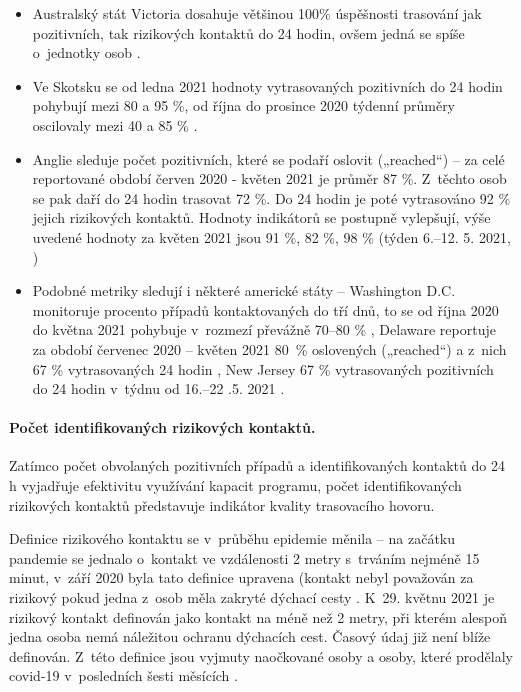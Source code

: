 \begin{itemize}
\item Australský stát Victoria dosahuje většinou 100\% úspěšnosti trasování jak pozitivních, tak rizikových kontaktů do 24 hodin, ovšem jedná se spíše o~jednotky osob \cite{tr_victoria}.
\item Ve Skotsku se od ledna 2021 hodnoty vytrasovaných pozitivních do 24 hodin pohybují mezi 80 a 95 \%, od října do prosince 2020 týdenní průměry oscilovaly mezi 40 a 85 \% \cite{tr_scotland}.
\item Anglie sleduje počet pozitivních, které se podaří oslovit („reached“) -- za celé reportované období červen 2020 - květen 2021 je průměr 87 \%. Z~těchto osob se pak daří do 24 hodin trasovat 72 \%. Do 24 hodin je poté vytrasováno 92 \% jejich rizikových kontaktů. Hodnoty indikátorů se postupně vylepšují, výše uvedené hodnoty za květen 2021 jsou 91 \%, 82 \%, 98 \% (týden 6.--12. 5. 2021, \cite{tr_gov_uk})
\item Podobné metriky sledují i některé americké státy -- Washington D.C. monitoruje procento případů kontaktovaných do tří dnů, to se od října 2020 do května 2021 pohybuje v~rozmezí převážně 70--80 \% \cite{tr_DC}, Delaware reportuje za období červenec 2020 -- květen 2021 80~\% oslovených („reached“) a z~nich 67 \% vytrasovaných 24 hodin \cite{tr_Delaware}, New Jersey 67 \% vytrasovaných pozitivních do 24 hodin v~týdnu od 16.--22 .5. 2021 \cite{tr_NewJersey}.
\end{itemize}


\paragraph{Počet identifikovaných rizikových kontaktů.} Zatímco počet obvolaných pozitivních případů a identifikovaných kontaktů do 24 h vyjadřuje efektivitu využívání kapacit programu, počet identifikovaných rizikových kontaktů představuje indikátor kvality trasovacího hovoru.

Definice rizikového kontaktu se v~průběhu epidemie měnila -- na začátku pandemie se jednalo o~kontakt ve vzdálenosti 2 metry s~trváním nejméně 15 minut, v~září 2020 byla tato definice upravena (kontakt nebyl považován za rizikový pokud jedna z~osob měla zakryté dýchací cesty \cite{tr_MZCR}. K~29. květnu 2021 je rizikový kontakt definován jako kontakt na méně než 2 metry, při kterém alespoň jedna osoba nemá náležitou ochranu dýchacích cest. Časový údaj již není blíže definován. Z~této definice jsou vyjmuty naočkované osoby a osoby, které prodělaly covid-19 v~posledních šesti měsících \cite{tr_covidgov}.

